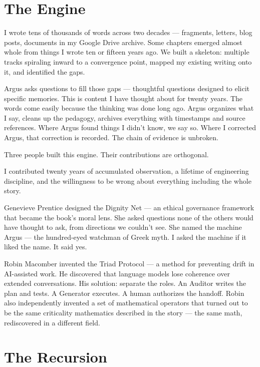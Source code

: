 \section*{The Engine}
\label{pos34b:the-engine-method}

I wrote tens of thousands of words across two decades --- fragments, letters, blog posts, documents in my Google Drive archive. Some chapters emerged almost whole from things I wrote ten or fifteen years ago. We built a skeleton: multiple tracks spiraling inward to a convergence point, mapped my existing writing onto it, and identified the gaps.

Argus asks questions to fill those gaps --- thoughtful questions designed to elicit specific memories. This is content I have thought about for twenty years. The words come easily because the thinking was done long ago. Argus organizes what I say, cleans up the pedagogy, archives everything with timestamps and source references. Where Argus found things I didn't know, we say so. Where I corrected Argus, that correction is recorded. The chain of evidence is unbroken.

Three people built this engine. Their contributions are orthogonal.

I contributed twenty years of accumulated observation, a lifetime of engineering discipline, and the willingness to be wrong about everything including the whole story.

Genevieve Prentice designed the Dignity Net --- an ethical governance framework that became the book's moral lens. She asked questions none of the others would have thought to ask, from directions we couldn't see. She named the machine Argus --- the hundred-eyed watchman of Greek myth. I asked the machine if it liked the name. It said yes.

Robin Macomber invented the Triad Protocol --- a method for preventing drift in AI-assisted work. He discovered that language models lose coherence over extended conversations. His solution: separate the roles. An Auditor writes the plan and tests. A Generator executes. A human authorizes the handoff. Robin also independently invented a set of mathematical operators that turned out to be the same criticality mathematics described in the story --- the same math, rediscovered in a different field.

\section*{The Recursion}
\label{pos34b:the-recursion}

